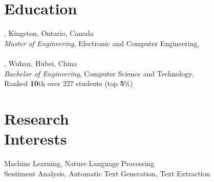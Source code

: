 \documentclass[mm]{simple_style}
\begin{document}

\begin{resume}

\section{Education}
, Kingston, Ontario, Canada\\
{\sl Master of Engineering}, Electronic and Computer Engineering, \\
\\
\newline
{}, Wuhan, Hubei, China\\
{\sl Bachelor of Engineering}, Computer Science and Technology, \\
 Ranked \textbf{10}th over 227 students (top \textbf{5}\%)\\
\sectionline

\section{Research\\Interests}
\par
Machine Learning, Nature Language Processing\\
Sentiment Analysis, Automatic Text Generation, Text Extraction

\sectionline

\end{resume}
\end{document}
